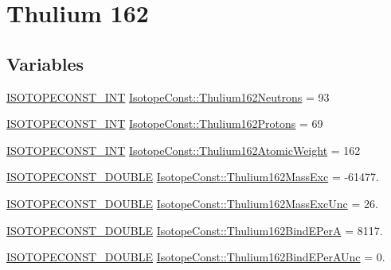 \hypertarget{group___isotope_const-_thulium-_tm162}{}\section{Thulium 162}
\label{group___isotope_const-_thulium-_tm162}
\subsection*{Variables}
\begin{DoxyCompactItemize}
\item 
\mbox{\hyperlink{group___isotope_const-_macros_ga5f18360b3e99483a35c32d789e62621c}{I\+S\+O\+T\+O\+P\+E\+C\+O\+N\+S\+T\+\_\+\+I\+NT}} \mbox{\hyperlink{group___isotope_const-_thulium-_tm162_ga6243b0c53ded6706b03f92bb6fee4963}{Isotope\+Const\+::\+Thulium162\+Neutrons}} = 93
\item 
\mbox{\hyperlink{group___isotope_const-_macros_ga5f18360b3e99483a35c32d789e62621c}{I\+S\+O\+T\+O\+P\+E\+C\+O\+N\+S\+T\+\_\+\+I\+NT}} \mbox{\hyperlink{group___isotope_const-_thulium-_tm162_ga8a3640d181690889be8ff47b9e573c91}{Isotope\+Const\+::\+Thulium162\+Protons}} = 69
\item 
\mbox{\hyperlink{group___isotope_const-_macros_ga5f18360b3e99483a35c32d789e62621c}{I\+S\+O\+T\+O\+P\+E\+C\+O\+N\+S\+T\+\_\+\+I\+NT}} \mbox{\hyperlink{group___isotope_const-_thulium-_tm162_gacdb550bb80eeee4ec9d5a3f1e7a94e1c}{Isotope\+Const\+::\+Thulium162\+Atomic\+Weight}} = 162
\item 
\mbox{\hyperlink{group___isotope_const-_macros_ga8f45a7272ce02c0b4c65c44636ed719a}{I\+S\+O\+T\+O\+P\+E\+C\+O\+N\+S\+T\+\_\+\+D\+O\+U\+B\+LE}} \mbox{\hyperlink{group___isotope_const-_thulium-_tm162_ga2c0ce40eb222ad4d6b84a2eef63a79c3}{Isotope\+Const\+::\+Thulium162\+Mass\+Exc}} = -\/61477.
\item 
\mbox{\hyperlink{group___isotope_const-_macros_ga8f45a7272ce02c0b4c65c44636ed719a}{I\+S\+O\+T\+O\+P\+E\+C\+O\+N\+S\+T\+\_\+\+D\+O\+U\+B\+LE}} \mbox{\hyperlink{group___isotope_const-_thulium-_tm162_ga6eb5e383fe7f1532840a60a05c18d3c1}{Isotope\+Const\+::\+Thulium162\+Mass\+Exc\+Unc}} = 26.
\item 
\mbox{\hyperlink{group___isotope_const-_macros_ga8f45a7272ce02c0b4c65c44636ed719a}{I\+S\+O\+T\+O\+P\+E\+C\+O\+N\+S\+T\+\_\+\+D\+O\+U\+B\+LE}} \mbox{\hyperlink{group___isotope_const-_thulium-_tm162_gacf0b47ca6fe131810976076c703e7064}{Isotope\+Const\+::\+Thulium162\+Bind\+E\+PerA}} = 8117.
\item 
\mbox{\hyperlink{group___isotope_const-_macros_ga8f45a7272ce02c0b4c65c44636ed719a}{I\+S\+O\+T\+O\+P\+E\+C\+O\+N\+S\+T\+\_\+\+D\+O\+U\+B\+LE}} \mbox{\hyperlink{group___isotope_const-_thulium-_tm162_ga86bb3cc319a95bdf03c0aa874d2c949d}{Isotope\+Const\+::\+Thulium162\+Bind\+E\+Per\+A\+Unc}} = 0.

\end{DoxyCompactItemize}

